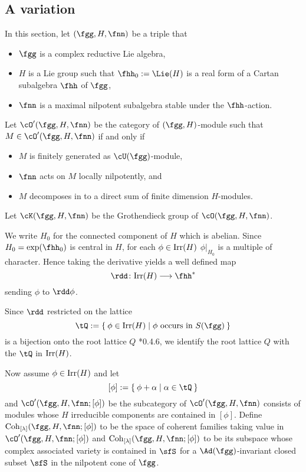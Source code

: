 \documentclass[counting_main.tex]{subfiles}
\begin{document}
\subsection{A variation}
In this section, let
$(\fgg, H,\fnn)$ be a triple that
\begin{itemize}
  \item $\fgg$ is a complex reductive Lie algebra,
  \item $H$ is a Lie group such that
        $\fhh_{0}:= \Lie(H)$ is a real form of
       a Cartan subalgebra  $\fhh$ of $\fgg$,
  \item $\fnn$ is a maximal nilpotent subalgebra
        stable under the $\fhh$-action.
\end{itemize}
Let $\cO'(\fgg, H,\fnn)$ be the category of $(\fgg, H)$-module such that
$M\in \cO'(\fgg,H,\fnn)$
if and only if
\begin{itemize}
  \item $M$ is finitely generated as $\cU(\fgg)$-module,
  \item $\fnn$ acts on $M$ locally nilpotently, and
  \item $M$ decomposes in to a direct sum of finite dimension $H$-modules.
\end{itemize}
Let $\Grt(\fgg,H,\fnn)$ be the Grothendieck group of $\cO(\fgg,H,\fnn)$.

We write $H_{0}$ for the connected component of $H$ which is abelian.
Since $H_{0} = \exp(\fhh_{0})$ is central in $H$, for each $\phi\in \mathrm{Irr}(H)$
$\phi|_{H_{0}}$ is a multiple of character.
Hence taking the derivative yields a
well defined map
\[
\rdd \colon \Irr(H)\longrightarrow \fhh^{*}
\]
sending $\phi$ to $\dphi$.


Since $\rdd$ restricted on the lattice
\[
\tQ:=\Set{\phi\in \Irr(H)|\phi \text{
    occurs in } S(\fgg)}
\]
 is a bijection onto the root lattice $Q$ \cite{Vg}*{0.4.6}, we identify the root lattice $Q$ with the $\tQ$ in $\mathrm{Irr}(H)$.


Now assume $\phi\in \mathrm{Irr}(H)$ and let
\[
  [\phi] := \Set{\phi+\alpha| \alpha\in \tQ}
\]
and
$\cO'(\fgg,H,\fnn;[\phi])$ be the subcategory of $\cO'(\fgg,H,\fnn)$
consists of modules whose $H$ irreducible components are contained in $[\phi]$.
Define $\Coh_{[\lambda]}(\fgg,H,\fnn;[\phi])$ to be the space of coherent
families taking value in $\cO'(\fgg,H,\fnn;[\phi])$ and
$\Coh_{[\lambda]}(\fgg,H,\fnn;[\phi])$ to be its subspace whose complex
associated variety is contained in $\sfS$ for a $\Ad(\fgg)$-invariant closed subset $\sfS$ in the nilpotent cone of
$\fgg$.
\end{document}
